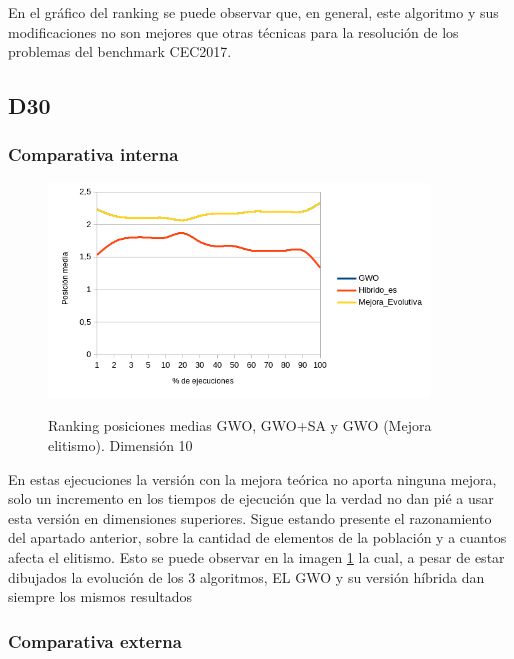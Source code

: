 \documentclass[a4paper]{report}
\begin{document}
En el gráfico del ranking se puede observar que, en general, este algoritmo y sus modificaciones no son mejores que otras técnicas para la resolución de los problemas del benchmark CEC2017.

\subsection{D30}


\subsubsection{Comparativa interna}







\begin{figure}[H]
    \centering
    \caption{Ranking posiciones medias GWO, GWO+SA y GWO (Mejora elitismo). Dimensión 10}
    \includegraphics[width=0.9\textwidth]{Resultados/Analisis_final/D30/GWO/Grafico_puestos.png}
    \label{img:aaaaaaaaaaaaaaaaaaaaaaa}

\end{figure}


En estas ejecuciones la versión con la mejora teórica no aporta ninguna mejora, solo un incremento en los tiempos de ejecución que la verdad no dan pié a usar esta versión en dimensiones superiores. Sigue estando presente el razonamiento del apartado anterior, sobre la cantidad de elementos de la población y a cuantos afecta el elitismo. Esto se puede observar en la imagen \ref{img:aaaaaaaaaaaaaaaaaaaaaaa} la cual, a pesar de estar dibujados la evolución de los 3 algoritmos, EL GWO y su versión híbrida dan siempre los mismos resultados


\subsubsection{Comparativa externa}
\end{document}
